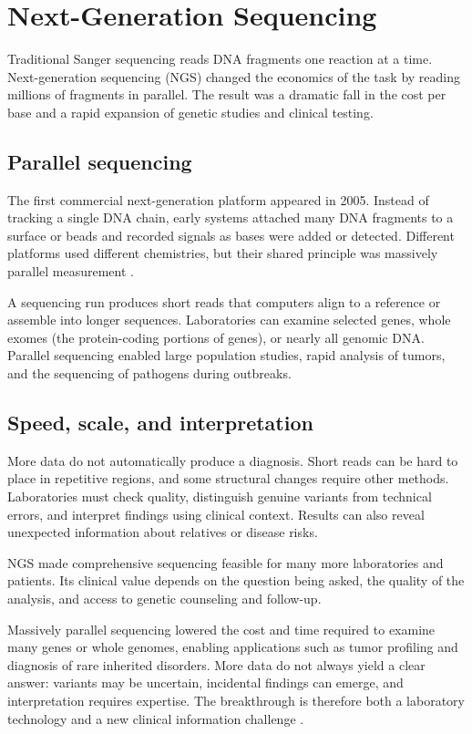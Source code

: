 \documentclass[12pt,oneside]{book}
\begin{document}
\chapter[Next-Generation Sequencing]{Next-Generation Sequencing}

Traditional Sanger sequencing reads DNA fragments one reaction at a time.
Next-generation sequencing (NGS) changed the economics of the task by
reading millions of fragments in parallel. The result was a dramatic fall in
the cost per base and a rapid expansion of genetic studies and clinical
testing.

\section{Parallel sequencing}
The first commercial next-generation platform appeared in 2005. Instead of
tracking a single DNA chain, early systems attached many DNA fragments to a
surface or beads and recorded signals as bases were added or detected.
Different platforms used different chemistries, but their shared principle
was massively parallel measurement \cite{ngsHistory}.

A sequencing run produces short reads that computers align to a reference or
assemble into longer sequences. Laboratories can examine selected genes,
whole exomes (the protein-coding portions of genes), or nearly all genomic
DNA. Parallel sequencing enabled large population studies, rapid analysis of
tumors, and the sequencing of pathogens during outbreaks.

\section{Speed, scale, and interpretation}
More data do not automatically produce a diagnosis. Short reads can be hard
to place in repetitive regions, and some structural changes require other
methods. Laboratories must check quality, distinguish genuine variants from
technical errors, and interpret findings using clinical context. Results can
also reveal unexpected information about relatives or disease risks.

NGS made comprehensive sequencing feasible for many more laboratories and
patients. Its clinical value depends on the question being asked, the
quality of the analysis, and access to genetic counseling and follow-up.

Massively parallel sequencing lowered the cost and time required to examine
many genes or whole genomes, enabling applications such as tumor profiling and
diagnosis of rare inherited disorders. More data do not always yield a clear
answer: variants may be uncertain, incidental findings can emerge, and
interpretation requires expertise. The breakthrough is therefore both a
laboratory technology and a new clinical information challenge
\cite{ngsHistory}.
\end{document}
